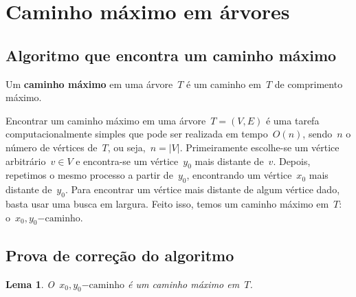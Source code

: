 \documentclass[a4paper,12pt]{article}
\newtheorem{lem}{Lema}
\newcommand{\caminho}{\mathrm{-caminho}}
\begin{document}
\section{Caminho máximo em árvores}
\label{sec:caminhoMaximo}
	\subsection{Algoritmo que encontra um caminho máximo}

	Um \textbf{caminho máximo} em uma árvore~$T$ é um caminho 
	em~$T$ de comprimento máximo.

	Encontrar um caminho máximo em uma árvore~$T=(V,E)$ é uma 
	tarefa computacionalmente simples que pode ser realizada em 
	tempo~$O(n)$, sendo~$n$ o número de vértices de~$T$, ou 
	seja,~${n =|V|}$. 
	Primeiramente escolhe-se um vértice arbitrário~$v \in V$ e 
	encontra-se um vértice~$y_0$ mais distante de~$v$.
	Depois, repetimos o mesmo processo a partir de~$y_0$, 
	encontrando um vértice~$x_0$ mais distante de~$y_0$. 
	Para encontrar um vértice mais distante de algum vértice dado, 
	basta usar uma busca em largura.  
	Feito isso, temos um caminho máximo em~$T$: o~$x_0,y_0\caminho$.

	\bigskip

	\subsection{Prova de correção do algoritmo}

	\begin{lem}
	\label{lema:caminhoMax}
		O~$x_0,y_0\caminho$ é um caminho máximo em~$T$.
	\end{lem}

	\bigskip
\end{document}
